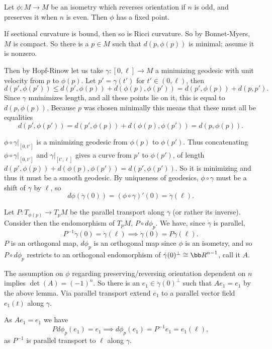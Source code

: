     Let $\phi\colon M\to M$ be an isometry which reverses orientation if $n$ is odd, and preserves it when $n$ is even.
    Then $\phi$ has a fixed point.

\ethrm

\bproof

    If sectional curvature is bound, then so is Ricci curvature.
    So by Bonnet-Myers, $M$ is compact.
    So there is a $p\in M$ such that $d(p,\phi(p))$ is minimal; assume it is nonzero.

    Then by Hopf-Rinow let us take $\gamma\colon[0,\ell]\to M$ a minimizing geodesic with unit velocity from $p$
    to $\phi(p)$.
    Let $p'=\gamma(t')$ for $t'\in(0,\ell)$, then
    $$ d(p',\phi(p')) \leq d(p',\phi(p)) + d(\phi(p),\phi(p')) = d(p',\phi(p)) + d(p,p') . $$
    Since $\gamma$ mninimizes length, and all these points lie on it, this is equal to $d(p,\phi(p))$.
    Because $p$ was chosen minimally this means that these must all be equalities
    $$ d(p',\phi(p')) = d(p',\phi(p)) + d(\phi(p),\phi(p')) = d(p,\phi(p)) . $$

    $\phi\circ\gamma|_{[0,t']}$ is a minimizing geodesic from $\phi(p)$ to $\phi(p')$.
    Thus concatenating $\phi\circ\gamma|_{[0,t']}$ and $\gamma|_{[t',\ell]}$ gives a curve from $p'$
    to $\phi(p')$, of length $d(p',\phi(p))+d(\phi(p),\phi(p'))=d(p',\phi(p'))$.
    So it is minimizing and thus it must be a smooth geodesic.
    By uniqueness of geodesics, $\phi\circ\gamma$ must be a shift of $\gamma$ by $\ell$, so
    $$ d\phi(\dot\gamma(0)) = (\phi\circ\gamma)'(0) = \dot\gamma(\ell) . $$

    Let $P\colon T_{\phi(p)}\to T_pM$ be the parallel transport along $\gamma$ (or rather its inverse).
    Consider then the endomorphism of $T_pM$, $P\circ d\phi_p$.
    We have, since $\dot\gamma$ is parallel,
    $$ P^{-1}\dot\gamma(0) = \dot\gamma(\ell) \implies \dot\gamma(0) = P\dot\gamma(\ell) . $$
    $P$ is an orthogonal map, $d\phi_p$ is an orthogonal map since $\phi$ is an isometry, and so $P\circ d\phi_p$
    restricts to an orthogonal endomorphism of $\dot\gamma(0)^\perp\cong\bR^{n-1}$, call it $A$.

    The assumption on $\phi$ regarding preserving/reversing orientation dependent on $n$ implies $\det(A)=(-1)^n$.
    So there is an $e_1\in\dot\gamma(0)^\perp$ such that $Ae_1=e_1$ by the above lemma.
    Via parallel transport extend $e_1$ to a parallel vector field $e_1(t)$ along $\gamma$.

    As $Ae_1=e_1$ we have
    $$ Pd\phi_p(e_1) = e_1 \implies d\phi_p(e_1) = P^{-1}e_1 = e_1(\ell) , $$
    as $P^{-1}$ is parallel transport to $\ell$ along $\gamma$.

